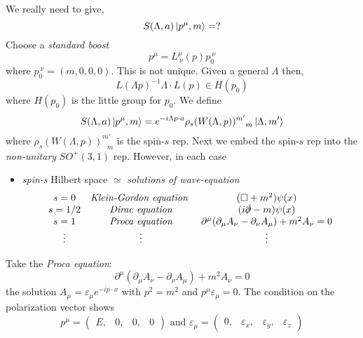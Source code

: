 We really need to give,
\begin{equation}
    S(\Lambda, a)\ket{p^{\mu}, m} = ?
\end{equation}
Choose a \textit{standard boost}
\begin{equation}
    p^{\mu} = L^{\mu}_{\ \nu}(p)p_{0}^{\ \nu}
\end{equation}
where $p_{0}^{\ \nu} = (m,0,0,0)$. This is not unique. Given a general $\Lambda$ then, 
\begin{equation}
    L(\Lambda p)^{-1}\Lambda\cdot L(p)\in H(p_0)
\end{equation}
where $H(p_0)$ is the little group for $p_0$. We define 
\begin{equation}
    S(\Lambda, a)\ket{p^{\mu}, m} = e^{-i\Lambda p\cdot  a}\rho_s(W(\Lambda,p))^{m'}_{\ \ \ m}\ket{\Lambda,m'}
\end{equation}
where $\rho_s(W(\Lambda,p))^{m'}_{\ \ \ m}$ is the spin-$s$ rep. Next we embed the spin-$s$ rep into the \textit{non-unitary} $SO^{+}(3,1)$ rep. However, in each case 
\begin{itemize}
    \item \textit{spin-s} Hilbert space $\simeq{}$ \textit{solutions of wave-equation}
    \begin{equation}
    \begin{matrix}
    s=0 & \textit{Klein-Gordon equation } & (\Box + m^2)\psi(x)\\
    s=1/2 & \textit{Dirac equation} & (i\slashed{\partial}-m)\psi(x)\\
    s=1 & \textit{ Proca equation } & \partial^{\mu}(\partial_{\mu}A_{\nu} - \partial_{\nu}A_{\mu}) + m^2A_{\nu}=0\\
    \vdots & \vdots & \vdots
    \end{matrix}
    \end{equation}
\end{itemize}
Take the \textit{Proca equation}:
\begin{equation}
    \partial^{\mu}(\partial_{\mu}A_{\nu} - \partial_{\nu}A_{\mu}) + m^2A_{\nu}=0
\end{equation}
the solution $A_{\mu} = \varepsilon_{\mu}e^{-ip\cdot x}$ with $p^2 = m^2$ and $p^{\mu}\varepsilon_{\mu}=0$. The condition on the polarization vector shows 
\begin{equation}
    p^{\mu} = \begin{pmatrix}
        E,& 0,& 0, & 0
    \end{pmatrix} \text{ and } \varepsilon_{\mu} = \begin{pmatrix}
        0,& \varepsilon_x,& \varepsilon_y,&\varepsilon_z
    \end{pmatrix}
\end{equation}

